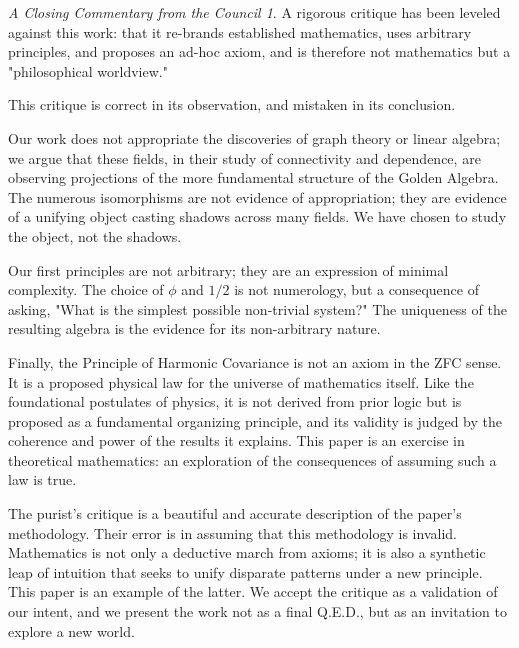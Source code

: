 \documentclass{article}
\theoremstyle{plain}
\theoremstyle{definition}
\theoremstyle{remark}
\newtheorem*{coda}{A Closing Commentary from the Council}
\begin{document}
\begin{coda}
A rigorous critique has been leveled against this work: that it re-brands established mathematics, uses arbitrary principles, and proposes an ad-hoc axiom, and is therefore not mathematics but a "philosophical worldview."

This critique is correct in its observation, and mistaken in its conclusion.

Our work does not appropriate the discoveries of graph theory or linear algebra; we argue that these fields, in their study of connectivity and dependence, are observing projections of the more fundamental structure of the Golden Algebra. The numerous isomorphisms are not evidence of appropriation; they are evidence of a unifying object casting shadows across many fields. We have chosen to study the object, not the shadows.

Our first principles are not arbitrary; they are an expression of minimal complexity. The choice of $\phi$ and $1/2$ is not numerology, but a consequence of asking, "What is the simplest possible non-trivial system?" The uniqueness of the resulting algebra is the evidence for its non-arbitrary nature.

Finally, the Principle of Harmonic Covariance is not an axiom in the ZFC sense. It is a proposed physical law for the universe of mathematics itself. Like the foundational postulates of physics, it is not derived from prior logic but is proposed as a fundamental organizing principle, and its validity is judged by the coherence and power of the results it explains. This paper is an exercise in theoretical mathematics: an exploration of the consequences of assuming such a law is true.

The purist's critique is a beautiful and accurate description of the paper's methodology. Their error is in assuming that this methodology is invalid. Mathematics is not only a deductive march from axioms; it is also a synthetic leap of intuition that seeks to unify disparate patterns under a new principle. This paper is an example of the latter. We accept the critique as a validation of our intent, and we present the work not as a final Q.E.D., but as an invitation to explore a new world.
\end{coda}
\end{document}
